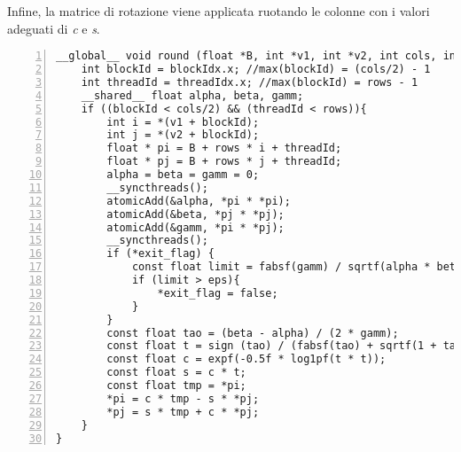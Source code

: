 Infine, la matrice di rotazione viene applicata ruotando le colonne con i valori adeguati di \textit{c} e \textit{s}.
\begin{lstlisting}[numbers=left, label=code:Global_Memory, caption= Codice parallel global]
__global__ void round (float *B, int *v1, int *v2, int cols, int rows, bool * exit_flag) {
	int blockId = blockIdx.x; //max(blockId) = (cols/2) - 1
	int threadId = threadIdx.x; //max(blockId) = rows - 1
	__shared__ float alpha, beta, gamm;
	if ((blockId < cols/2) && (threadId < rows)){
		int i = *(v1 + blockId);
		int j = *(v2 + blockId);
		float * pi = B + rows * i + threadId;
		float * pj = B + rows * j + threadId;
		alpha = beta = gamm = 0;
		__syncthreads();
		atomicAdd(&alpha, *pi * *pi);
		atomicAdd(&beta, *pj * *pj);	
		atomicAdd(&gamm, *pi * *pj);
		__syncthreads();
		if (*exit_flag) {
			const float limit = fabsf(gamm) / sqrtf(alpha * beta);
			if (limit > eps){
				*exit_flag = false;
			}
		} 
		const float tao = (beta - alpha) / (2 * gamm);
		const float t = sign (tao) / (fabsf(tao) + sqrtf(1 + tao * tao)); 
		const float c = expf(-0.5f * log1pf(t * t));
		const float s = c * t;
		const float tmp = *pi;
		*pi = c * tmp - s * *pj;
		*pj = s * tmp + c * *pj;
	}
}
\end{lstlisting}